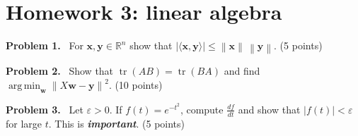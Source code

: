 \documentclass{article}
\newcommand{\R}{\mathbb{R}}
\newcommand{\norm}[1]{\left\lVert #1 \right\rVert}
\newcommand{\inner}[2]{\langle #1, #2 \rangle}
\newcommand{\dd}[2][]{\frac{d #1}{d #2}}
\renewcommand{\vec}[1]{\mathbf{#1}}
\DeclareMathOperator{\tr}{tr}
\DeclareMathOperator*{\argmin}{arg\,min}
\def\eps{\varepsilon}
\let\oldemph\emph
\renewcommand{\emph}[1]{\textbf{\oldemph{#1}}}
\newenvironment{problem}[1]{\par\medskip\noindent\textbf{Problem #1.}\ }{\par\medskip}
\newcommand{\points}[1]{\hfill(#1 points)}
\begin{document}
\section*{Homework 3: linear algebra}

\begin{problem}{1}
For $\vec{x}, \vec{y} \in \R^n$ show that $|\inner{\vec{x}}{\vec{y}}| \le \norm{\vec{x}}\,\norm{\vec{y}}$. \points{5}
\end{problem}

\begin{problem}{2}
Show that $\tr(AB) = \tr(BA)$ and find $\argmin_{\vec{w}} \norm{X\vec{w} - \vec{y}}^2$. \points{10}
\end{problem}

\begin{problem}{3}
Let $\eps > 0$. If $f(t) = e^{-t^2}$, compute $\dd[f]{t}$ and show that $|f(t)| < \eps$ for large $t$. This is \emph{important}. \points{5}
\end{problem}
\end{document}
